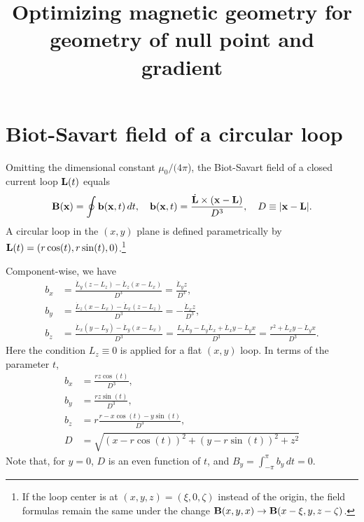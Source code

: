 \documentclass[10pt]{article}
\newcommand{\bfL}{{\bf L}}
\newcommand{\bfb}{{\bf b}}
\newcommand{\bfB}{{\bf B}}
\newcommand{\bfx}{{\bf x}}
\begin{document}
\title{\bf Optimizing magnetic geometry for geometry of null point and gradient}
\date{}
\maketitle

\section{Biot-Savart field of a circular loop}

Omitting the dimensional constant $\mu_0/(4\pi$), the Biot-Savart
field of a closed current loop $\bfL(t)$ equals
\begin{equation}
\bfB(\bfx)=\oint\bfb(\bfx,t)\,dt,\quad
\bfb(\bfx,t) = \frac{\dot\bfL\times(\bfx-\bfL)}{D^3},\quad D\equiv|\bfx-\bfL|.
\end{equation}
A circular loop in the $(x,y)$ plane is defined parametrically by
$\bfL(t)=(r\cos(t),r\sin(t),0)$.\footnote{If the loop center is at
$(x, y, z)=(\xi, 0, \zeta)$ instead of the origin, the field formulas
remain the same under the change
$\bfB(x,y,x)\to\bfB(x-\xi,y,z-\zeta)$.}

Component-wise, we have
\begin{equation}
\begin{aligned}
b_x &= \frac{\dot L_y(z-L_z) - \dot L_z(x-L_x)}{D^3} = \frac{\dot L_yz}{D^3},\\
b_y &= \frac{\dot L_z(x-L_x) - \dot L_x(z-L_z)}{D^3} = -\frac{\dot L_xz}{D^3},\\
b_z &= \frac{\dot L_x(y-L_y) - \dot L_y(x-L_x)}{D^3}
= \frac{L_x\dot L_y-L_y\dot L_x + \dot L_xy - \dot L_y x}{D^3}
= \frac{r^2 + \dot L_xy - \dot L_y x}{D^3}.
\end{aligned}
\end{equation}
Here the condition $L_z\equiv0$ is applied for a flat $(x,y)$ loop.  In terms of the parameter $t$,
\begin{equation}
\begin{aligned}
b_x &= \frac{rz\cos(t)}{D^3},\\
b_y &= \frac{rz\sin(t)}{D^3},\\
b_z &= r\frac{r - x\cos(t) - y\sin(t)}{D^3},\\
D   &= \sqrt{(x - r\cos(t))^2 + (y - r\sin(t))^2 + z^2}
\end{aligned}
\label{b}
\end{equation}
Note that, for $y=0$, $D$ is an even function of $t$, and $B_y=\int_{-\pi}^\pi b_y\,dt=0$.
\end{document}
